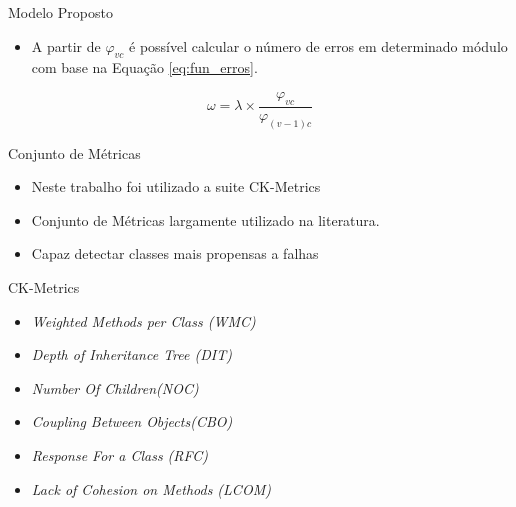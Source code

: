 \documentclass[t,14pt,mathserif]{beamer}
\begin{document}
\begin{frame}{Modelo Proposto}

	\begin{itemize}
		\item A partir de $\varphi_{vc}$ é possível calcular o número de erros em determinado módulo com base na Equação \ref{eq:fun_erros}{}.
	\end{itemize}
	
	\begin{equation} \label{eq:fun_erros}
    		\omega = \lambda \times \frac{\varphi_{vc}}{\varphi_{(v-1)c}}
	\end{equation}
\end{frame}
\begin{frame}{Conjunto de Métricas}
	
	\begin{itemize}
		\item Neste trabalho foi utilizado a suite \alert{CK-Metrics} \cite{chidamber1994metrics}
		\item Conjunto de Métricas largamente utilizado na literatura.
		\item Capaz detectar classes mais propensas a falhas \cite{basili1996validation}
	\end{itemize}

\end{frame}

\begin{frame}{CK-Metrics}
	
	\begin{itemize}
	\item \textit{Weighted Methods per Class (WMC)} 
	\item \textit{Depth of Inheritance Tree (DIT)}
	\item \textit{Number Of Children(NOC)}
	\item \textit{Coupling Between Objects(CBO)}	
	\item \textit{Response For a Class (RFC)}	
	\item \textit{Lack of Cohesion on Methods (LCOM)}
	\end{itemize}

\end{frame}

\end{document}
